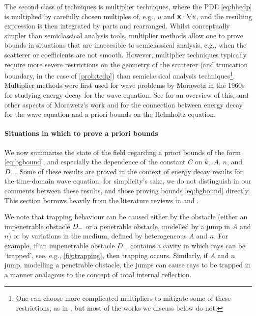 The second class of techniques is multiplier techniques, where the PDE \eqref{eq:hhedp} is multiplied by carefully chosen multiples of, e.g.,  $u$ and $\mathbf{x}\cdot\nabla u$, and the resulting expression is then integrated by parts and rearranged. Whilst conceptually simpler than semiclassical analysis tools, multiplier methods allow one to prove bounds in situations that are inaccesible to semiclassical analysis, e.g., when the scatterer or coefficients are not smooth. However, multiplier techniques typically require more severe restrictions on the geometry of the scatterer (and truncation boundary, in the case of \cref{prob:tedp}) than semiclassical analysis techniques\footnote{One can choose more complicated multipliers to mitigate some of these restrictions, as in \cite{MoRaSt:77}, but most of the works we discuss below do not.}. Multiplier methods were first used for wave problems by Morawetz in the 1960s for studying  energy decay for the wave equation. See \cite{GaGrPaSaSoTa:18} for an overview of this, and other aspects of Morawetz's work and \cite[Theorem 1.1]{Vo:99} for the connection between energy decay for the wave equation and a priori bounds on the Helmholtz equation.

\paragraph{Situations in which to prove a priori bounds} We now summarise the state of the field regarding a priori bounds of the form \eqref{eq:bgbound}, and especially the dependence of the constant $C$ on $k,$ $A$, $n$, and $D_{-}.$ Some of these results are proved in the context of energy decay results for the time-domain wave equation; for simplicity's sake, we do not distinguish in our comments between these results, and those proving bounds \eqref{eq:bgbound} directly. This section borrows heavily from the literature reviews in \cite[Section 1.1]{ChSpGiSm:17} and \cite[Sections 1 and 2.4]{GrPeSp:19}.

We note that trapping behaviour can be caused either by the obstacle (either an impenetrable obstacle $D_{-}$ or a penetrable obstacle, modelled by a jump in $A$ and $n$) or by variations in the medium, defined by heterogeneous $A$ and $n$. For example, if an impenetrable obstacle $D_{-}$ contains a cavity in which rays can be `trapped', see, e.g., \cref{fig:trapping}, then trapping occurs. Similarly, if $A$ and $n$ jump, modelling a penetrable obstacle, the jumps can cause rays to be trapped in a manner analagous to the concept of total internal reflection.

